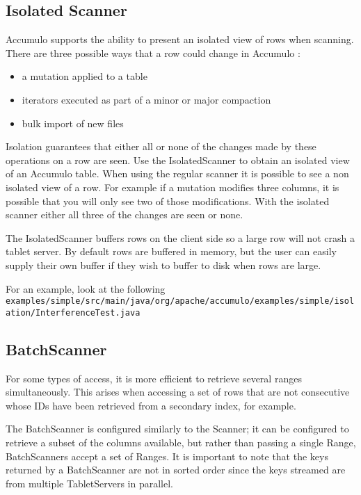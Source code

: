 \subsection{Isolated Scanner}

Accumulo supports the ability to present an isolated view of rows when
scanning. There are three possible ways that a row could change in Accumulo :

\begin{itemize}
 \item a mutation applied to a table
 \item iterators executed as part of a minor or major compaction
 \item bulk import of new files
\end{itemize}

Isolation guarantees that either all or none of the changes made by these
operations on a row are seen. Use the IsolatedScanner to obtain an isolated
view of an Accumulo table. When using the regular scanner it is possible to see
a non isolated view of a row. For example if a mutation modifies three
columns, it is possible that you will only see two of those modifications.
With the isolated scanner either all three of the changes are seen or none.

The IsolatedScanner buffers rows on the client side so a large row will not
crash a tablet server. By default rows are buffered in memory, but the user
can easily supply their own buffer if they wish to buffer to disk when rows are
large.

For an example, look at the following\\ 
\texttt{examples/simple/src/main/java/org/apache/accumulo/examples/simple/isolation/InterferenceTest.java}

\subsection{BatchScanner}

For some types of access, it is more efficient to retrieve several ranges
simultaneously. This arises when accessing a set of rows that are not consecutive
whose IDs have been retrieved from a secondary index, for example.

The BatchScanner is configured similarly to the Scanner; it can be configured to
retrieve a subset of the columns available, but rather than passing a single Range,
BatchScanners accept a set of Ranges. It is important to note that the keys returned
by a BatchScanner are not in sorted order since the keys streamed are from multiple
TabletServers in parallel.


